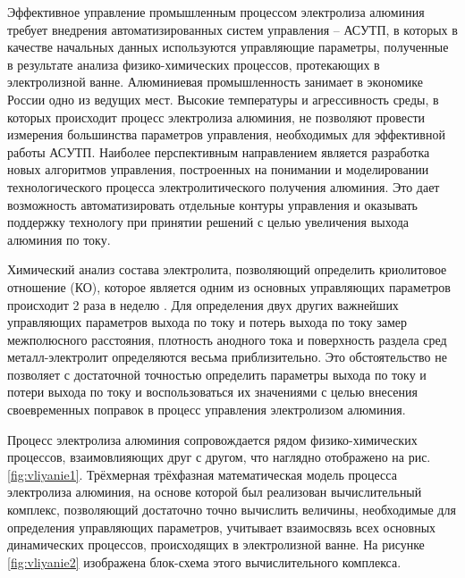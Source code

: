 \documentclass[]{pmi}
\begin{document}
\pmiemptyspace
\pmiemptyspace
{}
%


Эффективное управление промышленным процессом электролиза алюминия требует внедрения автоматизированных систем управления – АСУТП, в которых в качестве начальных данных используются управляющие параметры, полученные в результате анализа физико-химических процессов, протекающих в электролизной ванне. Алюминиевая промышленность занимает в экономике России одно из ведущих мест. Высокие температуры и агрессивность среды, в которых происходит процесс электролиза алюминия, не позволяют провести измерения большинства параметров управления, необходимых для эффективной работы АСУТП. Наиболее перспективным направлением является разработка новых алгоритмов управления, построенных на понимании и моделировании технологического процесса электролитического получения алюминия. Это дает возможность автоматизировать отдельные контуры управления и оказывать поддержку технологу при принятии решений с целью увеличения выхода алюминия по току. 

Химический анализ состава электролита, позволяющий определить криолитовое отношение (КО), которое является одним из основных управляющих параметров происходит 2 раза в неделю \cite{litlink:belo}. Для определения двух других важнейших управляющих параметров выхода по току и потерь выхода по току замер межполюсного расстояния, плотность анодного тока и поверхность раздела сред металл-электролит определяются весьма приблизительно. Это обстоятельство не позволяет с достаточной точностью определить параметры выхода по току и потери выхода по току и воспользоваться их значениями с целью внесения своевременных поправок в процесс управления электролизом алюминия.

Процесс электролиза алюминия сопровождается рядом физико-химических процессов, взаимовлияющих друг с другом, что наглядно отображено на рис. \ref{fig:vliyanie1}. Трёхмерная трёхфазная математическая модель процесса электролиза алюминия, на основе которой был реализован вычислительный комплекс, позволяющий достаточно точно вычислить величины, необходимые для определения управляющих параметров, учитывает взаимосвязь всех основных динамических процессов, происходящих в электролизной ванне. На рисунке \ref{fig:vliyanie2} изображена блок-схема этого вычислительного комплекса.
\end{document}
